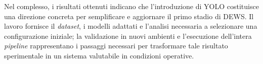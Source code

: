 Nel complesso, i risultati ottenuti indicano che l'introduzione di YOLO costituisce una direzione concreta per semplificare e aggiornare il primo stadio di DEWS. Il lavoro fornisce il \textit{dataset}, i modelli adattati e l'analisi necessaria a selezionare una configurazione iniziale; la validazione in nuovi ambienti e l'esecuzione dell'intera \textit{pipeline} rappresentano i passaggi necessari per trasformare tale risultato sperimentale in un sistema valutabile in condizioni operative.
